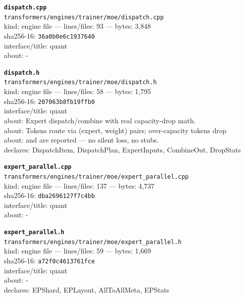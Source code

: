 \noindent\textbf{\texttt{dispatch.cpp}}\\
\texttt{transformers/engines/trainer/moe/dispatch.cpp}\\
kind: engine file --- lines/files: 93 --- bytes: 3,848\\
sha256-16: \texttt{36a0b0e6c1937640}\\
interface/title: quant\\
about: -\\
\vspace*{6.0pt}

\noindent\textbf{\texttt{dispatch.h}}\\
\texttt{transformers/engines/trainer/moe/dispatch.h}\\
kind: engine file --- lines/files: 58 --- bytes: 1,795\\
sha256-16: \texttt{207063b8fb19ffb0}\\
interface/title: quant\\
about: Expert dispatch/combine with real capacity-drop math.\\
about: Tokens route via (expert, weight) pairs; over-capacity tokens drop\\
about: and are reported — no silent loss, no stubs.\\
declares: DispatchItem, DispatchPlan, ExpertInputs, CombineOut, DropStats\\
\vspace*{6.0pt}
\newpage

\noindent\textbf{\texttt{expert\_parallel.cpp}}\\
\texttt{transformers/engines/trainer/moe/expert\_parallel.cpp}\\
kind: engine file --- lines/files: 137 --- bytes: 4,737\\
sha256-16: \texttt{dba2696127f7c4bb}\\
interface/title: quant\\
about: -\\
\vspace*{6.0pt}

\noindent\textbf{\texttt{expert\_parallel.h}}\\
\texttt{transformers/engines/trainer/moe/expert\_parallel.h}\\
kind: engine file --- lines/files: 59 --- bytes: 1,669\\
sha256-16: \texttt{a72f0c4613761fce}\\
interface/title: quant\\
about: -\\
declares: EPShard, EPLayout, AllToAllMeta, EPStats\\
\vspace*{6.0pt}

